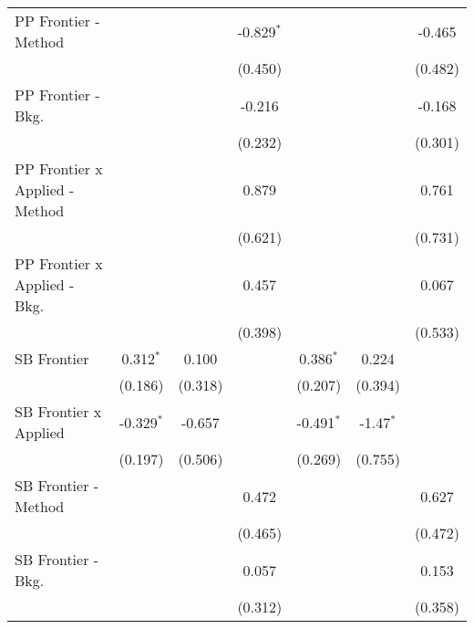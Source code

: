 \begin{tabular}{lcccccc}
   PP Frontier - Method           &               &              & -0.829$^{*}$ &                &              & -0.465\\   
                                  &               &              & (0.450)      &                &              & (0.482)\\   
   PP Frontier - Bkg.             &               &              & -0.216       &                &              & -0.168\\   
                                  &               &              & (0.232)      &                &              & (0.301)\\   
   PP Frontier x Applied - Method &               &              & 0.879        &                &              & 0.761\\   
                                  &               &              & (0.621)      &                &              & (0.731)\\   
   PP Frontier x Applied - Bkg.   &               &              & 0.457        &                &              & 0.067\\   
                                  &               &              & (0.398)      &                &              & (0.533)\\   
   SB Frontier                    & 0.312$^{*}$   & 0.100        &              & 0.386$^{*}$    & 0.224        &   \\   
                                  & (0.186)       & (0.318)      &              & (0.207)        & (0.394)      &   \\   
   SB Frontier x Applied          & -0.329$^{*}$  & -0.657       &              & -0.491$^{*}$   & -1.47$^{*}$  &   \\   
                                  & (0.197)       & (0.506)      &              & (0.269)        & (0.755)      &   \\   
   SB Frontier - Method           &               &              & 0.472        &                &              & 0.627\\   
                                  &               &              & (0.465)      &                &              & (0.472)\\   
   SB Frontier - Bkg.             &               &              & 0.057        &                &              & 0.153\\   
                                  &               &              & (0.312)      &                &              & (0.358)\\   

\end{tabular}
